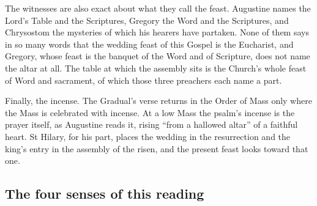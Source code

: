 The witnesses are also exact about what they call the feast. Augustine names
the Lord's Table and the Scriptures, Gregory the Word and the Scriptures, and
Chrysostom the mysteries of which his hearers have partaken. None of them says
in so many words that the wedding feast of this Gospel is the Eucharist, and
Gregory, whose feast is the banquet of the Word and of Scripture, does not
name the altar at all. The table at which the assembly sits is the Church's
whole feast of Word and sacrament, of which those three preachers each name a
part.

Finally, the incense. The Gradual's verse returns in the Order of Mass only
where the Mass is celebrated with incense. At a low Mass the psalm's incense is
the prayer itself, as Augustine reads it, rising ``from a hallowed altar'' of
a faithful heart. St Hilary, for his part, places the wedding in the
resurrection and the king's entry in the assembly of the risen, and the present
feast looks toward that one.

\subsection{The four senses of this reading}

